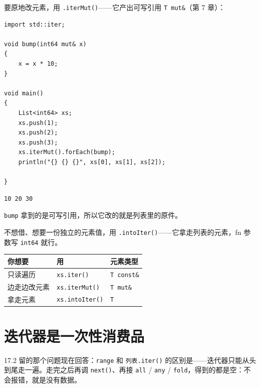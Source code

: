 要原地改元素，用 \texttt{.\allowbreak{}iter\allowbreak{}Mut(\allowbreak{})\allowbreak{}}——它产出可写引用 \texttt{T mut\&}（第 7 章）：

\par
\medskip
\begin{lstlisting}[style=chali]
import std::iter;

void bump(int64 mut& x)
{
    x = x * 10;
}

void main()
{
    List<int64> xs;
    xs.push(1);
    xs.push(2);
    xs.push(3);
    xs.iterMut().forEach(bump);
    println("{} {} {}", xs[0], xs[1], xs[2]);

}
\end{lstlisting}
\par
\medskip

\par
\medskip
\begin{lstlisting}[style=out]
10 20 30
\end{lstlisting}
\par
\medskip

\texttt{bump} 拿到的是可写引用，所以它改的就是列表里的原件。

不想借、想要一份独立的元素值，用 \texttt{.\allowbreak{}into\allowbreak{}Iter(\allowbreak{})\allowbreak{}}——它拿走列表的元素，fn 参数写 \texttt{int64} 就行。

\begin{center}
\begin{tabular}{lll}
\toprule
你想要 & 用 & 元素类型 \\
\midrule
只读遍历 & \texttt{xs.\allowbreak{}iter(\allowbreak{})\allowbreak{}} & \texttt{T const\&} \\
边走边改元素 & \texttt{xs.\allowbreak{}iter\allowbreak{}Mut(\allowbreak{})\allowbreak{}} & \texttt{T mut\&} \\
拿走元素 & \texttt{xs.\allowbreak{}into\allowbreak{}Iter(\allowbreak{})\allowbreak{}} & \texttt{T} \\
\bottomrule
\end{tabular}
\end{center}

\section{迭代器是一次性消费品}

17.2 留的那个问题现在回答：\texttt{range} 和 \texttt{列表.\allowbreak{}iter(\allowbreak{})\allowbreak{}} 的区别是——迭代器只能从头到尾走一遍。走完之后再调 \texttt{next(\allowbreak{})\allowbreak{}}、再接 \texttt{all} / \texttt{any} / \texttt{fold}，得到的都是空：不会报错，就是没有数据。

